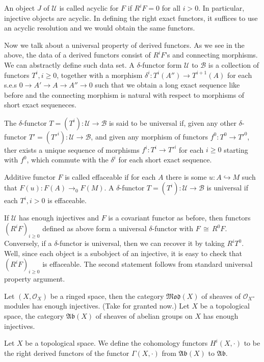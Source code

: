 \documentclass[12pt]{article}
\theoremstyle{plain}
\theoremstyle{definition}
\newcommand{\sB}{\mathcal{B}}
\newcommand{\sU}{\mathcal{U}}
\newcommand{\sO}{\mathcal{O}}
\newcommand\iso{{\, \cong \,}}
\newcommand{\<}{\langle}
\renewcommand{\>}{\rangle}
\newcommand{\into}{\hookrightarrow}
\newcommand{\Mod}{\mathfrak{Mod}}
\newcommand{\Ab}{\mathfrak{Ab}}
\begin{document}
An object $J$ of $\sU$ is called acyclic for $F$ if $R^i F = 0 $ for all $i > 0$. In particular, injective objects are acyclic. In defining the right exact functors, it suffices to use an acyclic resolution and we would obtain the same functors. 

Now we talk about a universal property of derived functors. As we see in the above, the data of a derived functors consist of $R^i F$'s and connecting morphisms. We can abstractly define such data set. A $\delta$-functor form $\sU$ to $\sB$ is a collection of functors $T^i, i \ge 0$, together with a morphism $\delta^i : T^i(A'') \to T^{i + 1}(A)$ for each s.e.s $0 \to A' \to A \to A'' \to 0$ such that we obtain a long exact sequence like before and the connecting morphism is natural with respect to morphisms of short exact sequeneces. 

The $\delta$-functor $T = (T^i) : \sU \to \sB$ is said to be universal if, given any other $\delta$-functor $T' = (T'^i) : \sU \to \sB$, and given any morphism of functors $f^0 : T^0 \to T'^0$, ther exists a unique sequence of morphisms $f^i : T^i \to T'^i$ for each $i \ge 0$ starting with $f^0$, which commute with the $\delta^i$ for each short exact sequence. 

Additive functor $F$ is called effaceable if for each $A$ there is some $u : A \into M$ such that $F(u) : F(A) \to_0 F(M)$. A $\delta$-functor $T = (T^i) : \sU \to \sB$ is universal if each $T^i, i > 0$ is effaceable. 

If $\sU$ has enough injectives and $F$ is a covariant functor as before, then functors $ (R^i F)_{i \ge 0} $ defined as above form a universal $\delta$-functor with $F \iso R^0 F$. Conversely, if a $\delta$-functor is universal, then we can recover it by taking $R^i T^0$. Well, since each object is a subobject of an injective, it is easy to check that $ (R^i F)_{i \ge 0} $ is effaceable. The second statement follows from standard universal property argument. 

Let $(X, \sO_X)$ be a ringed space, then the category $\Mod(X)$ of sheaves of $\sO_X$-modules has enough injectives. (Take for granted now.) Let $X$ be a topological space, the category $\Ab(X)$ of sheaves of abelian groups on $X$ has enough injectives. 

Let $X$ be a topological space. We define the cohomology functors $H^i(X, \cdot)$ to be the right derived functors of the functor $\Gamma(X, \cdot)$ from $\Ab(X)$ to $\Ab$. 
\end{document}
